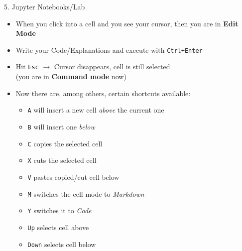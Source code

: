 
\begin{vbframe}{5. Jupyter Notebooks/Lab}

\vfill

\begin{itemize}
	\item When you click into a cell and you see your cursor, then you are in \textbf{Edit Mode}
	\item Write your Code/Explanations and execute with \texttt{Ctrl+Enter}
	\item Hit \texttt{Esc} $\rightarrow$ Cursor disappears, cell is still selected\\
  (you are in \textbf{Command mode} now)
	\item Now there are, among others, certain shortcuts available:
	\begin{itemize}
		\item \texttt{A} will insert a new cell \textit{above} the current one
    \item \texttt{B} will insert one \textit{below}
    \item \texttt{C} copies the selected cell
    \item \texttt{X} cuts the selected cell
    \item \texttt{V} pastes copied/cut cell below
    \item \texttt{M} switches the cell mode to \textit{Markdown}
    \item \texttt{Y} switches it to \textit{Code}
    \item \texttt{Up} selects cell above
    \item \texttt{Down} selects cell below
	\end{itemize}
\end{itemize}

\vfill

\end{vbframe}


